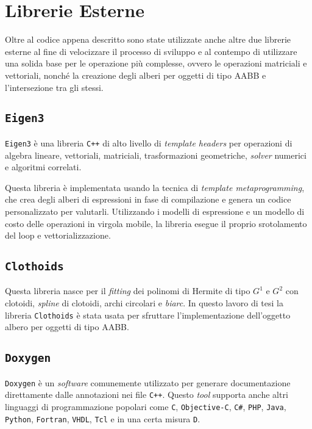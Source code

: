 \section{Librerie Esterne}
Oltre al codice appena descritto sono state utilizzate anche altre due librerie esterne al fine di velocizzare il processo di sviluppo e al contempo di utilizzare una solida base per le operazione più complesse, ovvero le operazioni matriciali e vettoriali, nonché la creazione degli alberi per oggetti di tipo \ac{AABB} e l'intersezione tra gli stessi.
%
\subsection{\texttt{Eigen3}}
\texttt{Eigen3} è una libreria \texttt{C++} di alto livello di \textit{template headers} per operazioni di algebra lineare, vettoriali, matriciali, trasformazioni geometriche, \textit{solver} numerici e algoritmi correlati.

Questa libreria è implementata usando la tecnica di \textit{template metaprogramming}, che crea degli alberi di espressioni in fase di compilazione e genera un codice personalizzato per valutarli. Utilizzando i modelli di espressione e un modello di costo delle operazioni in virgola mobile, la libreria esegue il proprio srotolamento del loop e vettorializzazione.
%
\subsection{\texttt{Clothoids}}
Questa libreria nasce per il \textit{fitting} dei polinomi di Hermite di tipo $G^1$ e $G^2$ con clotoidi, \textit{spline} di clotoidi, archi circolari e \textit{biarc}. In questo lavoro di tesi la libreria \texttt{Clothoids} è stata usata per sfruttare l'implementazione dell'oggetto albero per oggetti di tipo \ac{AABB}.
%
\subsection{\texttt{Doxygen}}
\texttt{Doxygen} è un \textit{software} comunemente utilizzato per generare documentazione direttamente dalle annotazioni nei file \texttt{C++}. Questo \textit{tool} supporta anche altri linguaggi di programmazione popolari come \texttt{C}, \texttt{Objective-C}, \texttt{C\#}, \texttt{PHP},  \texttt{Java},  \texttt{Python}, \texttt{Fortran},  \texttt{VHDL},  \texttt{Tcl} e in una certa misura  \texttt{D}.

